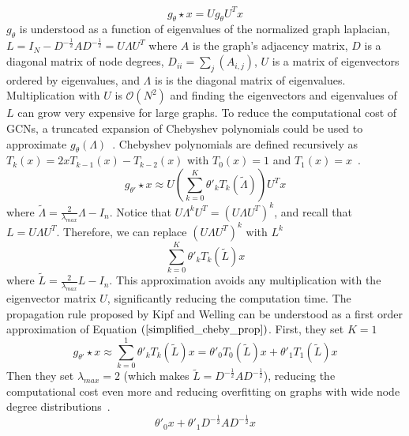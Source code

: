 \begin{equation}
\label{spectral_prop}
g_\theta \star x = Ug_\theta U^Tx
\end{equation}
$g_\theta$ is understood as a function of eigenvalues of the normalized graph laplacian, $L = I_N - D^{-\frac{1}{2}}AD^{-\frac{1}{2}} = U\Lambda U^T$ where $A$ is the graph's adjacency matrix, $D$ is a diagonal matrix of node degrees, $D_{ii} = \sum_{j} (A_{i,j})$, $U$ is a matrix of eigenvectors ordered by eigenvalues, and $\Lambda$ is is the diagonal matrix of eigenvalues. Multiplication with $U$ is $\mathcal{O}(N^2) $ and finding the eigenvectors and eigenvalues of $L$ can grow very expensive for large graphs. To reduce
 the computational cost of GCNs, a truncated expansion of Chebyshev polynomials could be used to approximate $g_\theta (\Lambda)$~\cite{Defferrard2016}.
Chebyshev polynomials are defined recursively as $T_k(x) = 2xT_{k-1}(x) - T_{k-2}(x)$ with $T_0(x) = 1$ and $T_1(x) = x$~\cite{Hammond2011}.
\begin{equation}
\label{cheby_prop}
g_{\theta'} \star x \approx U(\sum\limits_{k=0}^{K}\theta'_k T_k (\tilde{\Lambda}))U^Tx
\end{equation}
where $\tilde{\Lambda} = \frac{2}{\lambda_{max}} \Lambda - I_n$. Notice that $U \Lambda^k U^T = (U \Lambda U^T)^k$, and recall that $L = U\Lambda U^T$. Therefore, we can replace $(U \Lambda U^T)^k$ with $L^k$
\begin{equation}
\label{simplified_cheby_prop}
\sum\limits_{k=0}^{K} \theta'_k T_k (\tilde{L})x
\end{equation}
where  $\tilde{L} = \frac{2}{\lambda_{max}} L - I_n$. This approximation avoids any multiplication with the eigenvector matrix $U$, significantly reducing the computation time. The propagation rule proposed by Kipf and Welling can be understood as a first order approximation of Equation $(\ref{simplified_cheby_prop})$. First, they set $K = 1$
\begin{equation}
\label{firstorder_cheby}
g_{\theta'} \star x \approx \sum\limits_{k=0}^{1} \theta'_k T_k (\tilde{L})x = \theta'_0 T_0 (\tilde{L})x + \theta'_1 T_1 (\tilde{L})x
\end{equation}
Then they set $\lambda_{max} = 2$ (which makes $\tilde{L} = D^{-\frac{1}{2}}AD^{-\frac{1}{2}}$), reducing the computational cost even more and reducing overfitting on graphs with wide node degree distributions~\cite{Kipf2016}.
\begin{equation}
\label{two_params}
\theta'_0x + \theta'_1 D^{-\frac{1}{2}}AD^{-\frac{1}{2}}x 
\end{equation}
